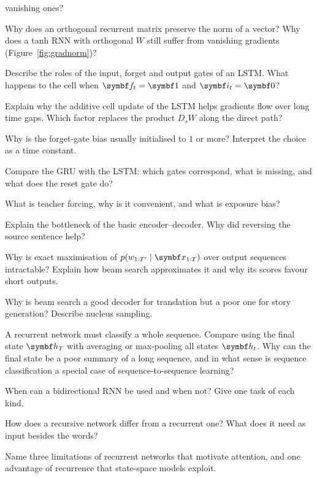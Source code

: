 \documentclass[11pt]{article}
\newcommand{\hv}{\vect{h}}
\newcommand{\iv}{\vect{i}}
\newcommand{\fv}{\vect{f}}
\begin{document}
\begin{questions}
\begin{conceptual}
  vanishing ones?
\item Why does an orthogonal recurrent matrix preserve the norm of a vector? Why does a tanh RNN with orthogonal $W$
  still suffer from vanishing gradients (Figure~\ref{fig:gradnorm})?
\item Describe the roles of the input, forget and output gates of an LSTM. What happens to the cell when $\fv_t = \vect{1}$
  and $\iv_t = \vect{0}$?
\item Explain why the additive cell update of the LSTM helps gradients flow over long time gaps. Which factor replaces
  the product $D_sW$ along the direct path?
\item Why is the forget-gate bias usually initialised to $1$ or more? Interpret the choice as a time constant.
\item Compare the GRU with the LSTM: which gates correspond, what is missing, and what does the reset gate do?
\item What is teacher forcing, why is it convenient, and what is exposure bias?
\item Explain the bottleneck of the basic encoder--decoder. Why did reversing the source sentence help?
\item Why is exact maximisation of $p(w_{1:T'} \mid \x_{1:T})$ over output sequences intractable? Explain how beam search
  approximates it and why its scores favour short outputs.
\item Why is beam search a good decoder for translation but a poor one for story generation? Describe nucleus sampling.
\item A recurrent network must classify a whole sequence. Compare using the final state $\hv_T$ with averaging or
  max-pooling all states $\hv_t$. Why can the final state be a poor summary of a long sequence, and in what sense is
  sequence classification a special case of sequence-to-sequence learning?
\item When can a bidirectional RNN be used and when not? Give one task of each kind.
\item How does a recursive network differ from a recurrent one? What does it need as input besides the words?
\item Name three limitations of recurrent networks that motivate attention, and one advantage of recurrence that
  state-space models exploit.
\end{conceptual}


\end{questions}
\end{document}
